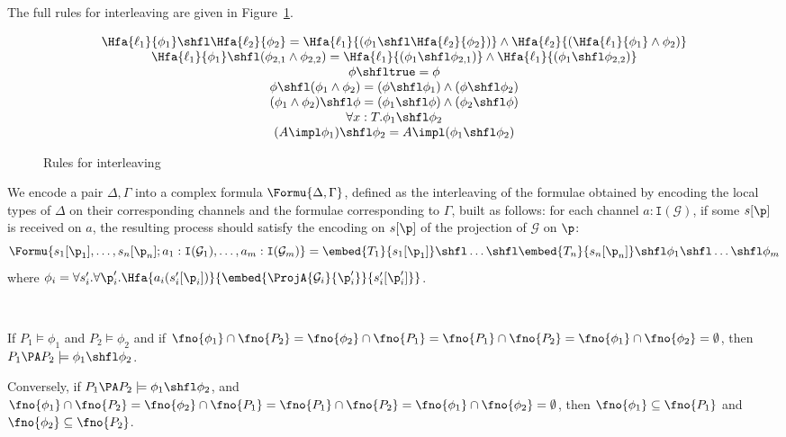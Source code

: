 The full rules for interleaving are given in Figure~\ref{fig:int}.

\begin{figure}
\[\begin{array}{ccc}
 \Hfa{\ell_1}{\phi_1} \shfl
\Hfa{\ell_2}{\phi_2}   =  \Hfa{\ell_1}{(\phi_1 \shfl
  \Hfa{\ell_2}{\phi_2})} \land \Hfa{\ell_2}{(\Hfa{\ell_1}{\phi_1}
  \land \phi_2)}\\
\Hfa{\ell_1}{\phi_1} \shfl (\phi_{2,1} \land \phi_{2,2})  = 
\Hfa{\ell_1}{(\phi_1 \shfl \phi_{2,1})} \land \Hfa{\ell_1}{(\phi_1
  \shfl \phi_{2,2})}\\
\phi \shfl \mathtt{true}  =  \phi\\
\phi \shfl (\phi_1 \land \phi_2)  =  (\phi \shfl \phi_1) \land
(\phi \shfl \phi_2)\\
(\phi_1 \land \phi_2) \shfl \phi  =  (\phi_1 \shfl \phi) \land
(\phi_2 \shfl \phi)\\
\forall x:T.\phi_1 \shfl \phi_2\\
(A \impl \phi_1) \shfl \phi_2  =  A \impl (\phi_1 \shfl
\phi_2)
\end{array}\]
\label{fig:int}
\caption{Rules for interleaving}
\end{figure}





We encode a pair $\Delta,\Gamma$ into a complex formula
$\Formu{\Delta,\Gamma}$, defined as the interleaving of the formulae
obtained by encoding the local types of $\Delta$ on their
corresponding channels and the formulae corresponding to $\Gamma$,
built as follows: for each channel $a:\mathtt{I}(\mathcal{G})$, if
some $s[\p]$ is received on $a$, the resulting process should satisfy
the encoding on $s[\p]$ of the projection of $\mathcal{G}$ on $\p$:
\[\Formu{s_1[\p_1],\dots,s_n[\p_n];a_1:\mathtt{I}(\mathcal{G}_1),
    \dots,a_m:\mathtt{I}(\mathcal{G}_m)}
= \embed{T_1}{s_1[\p_1]}
  \shfl \dots \shfl \embed{T_n}{s_n[\p_n]} \shfl 
\phi_1 \shfl \dots \shfl \phi_m
\]
where 
$\phi_i=\forall   s'_i.\forall\p'_i.\Hfa{a_i(s'_i[\p_i])}
  {\embed{\ProjA{\mathcal{G}_i}{\p'_i}}{s'_i[\p'_i]}} $.

\begin{LEM}
~\label{lemma:hml:shcorr}

If $P_1 \models \phi_1$ and $P_2
\models \phi_2$ and if $\fno{\phi_1} \cap \fno{P_2} = \fno{\phi_2}
\cap \fno{P_1} = \fno{P_1} \cap \fno{P_2} = \fno{\phi_1}\cap
\fno{\phi_2} = \emptyset$, then $P_1 \PA P_2 \models \phi_1 \shfl
\phi_2$.


Conversely, if $P_1 \PA P_2 \models \phi_1 \shfl \phi_2$, and 
$\fno{\phi_1} \cap \fno{P_2} = \fno{\phi_2} \cap \fno{P_1} = \fno{P_1}
\cap \fno{P_2} = \fno{\phi_1}\cap \fno{\phi_2} = \emptyset$, then
$\fno{\phi_1} \subseteq \fno{P_1}$ and $\fno{\phi_2} \subseteq
\fno{P_2}$.

\end{LEM}

